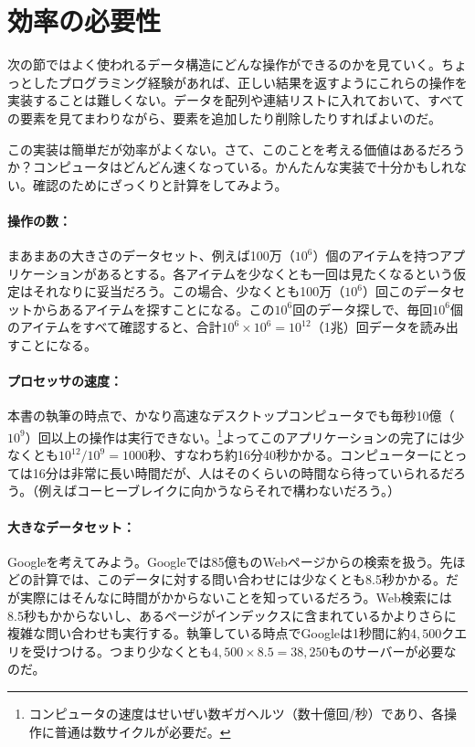 \section{効率の必要性}

次の節ではよく使われるデータ構造にどんな操作ができるのかを見ていく。ちょっとしたプログラミング経験があれば、正しい結果を返すようにこれらの操作を実装することは難しくない。データを配列や連結リストに入れておいて、すべての要素を見てまわりながら、要素を追加したり削除したりすればよいのだ。

この実装は簡単だが効率がよくない。さて、このことを考える価値はあるだろうか？コンピュータはどんどん速くなっている。かんたんな実装で十分かもしれない。確認のためにざっくりと計算をしてみよう。

\paragraph{操作の数：}
まあまあの大きさのデータセット、例えば100万（$10^6$）個のアイテムを持つアプリケーションがあるとする。各アイテムを少なくとも一回は見たくなるという仮定はそれなりに妥当だろう。この場合、少なくとも100万（$10^6$）回このデータセットからあるアイテムを探すことになる。この$10^6$回のデータ探しで、毎回$10^6$個のアイテムをすべて確認すると、合計$10^6\times 10^6=10^{12}$（1兆）回データを読み出すことになる。

\paragraph{プロセッサの速度：}
本書の執筆の時点で、かなり高速なデスクトップコンピュータでも毎秒10億（$10^9$）回以上の操作は実行できない。\footnote{コンピュータの速度はせいぜい数ギガヘルツ（数十億回/秒）であり、各操作に普通は数サイクルが必要だ。}よってこのアプリケーションの完了には少なくとも$10^{12}/10^9=1000$秒、すなわち約16分40秒かかる。コンピューターにとっては16分は非常に長い時間だが、人はそのくらいの時間なら待っていられるだろう。（例えばコーヒーブレイクに向かうならそれで構わないだろう。）

\paragraph{大きなデータセット：}
Googleを考えてみよう。Googleでは85億ものWebページからの検索を扱う。先ほどの計算では、このデータに対する問い合わせには少なくとも8.5秒かかる。だが実際にはそんなに時間がかからないことを知っているだろう。Web検索には8.5秒もかからないし、あるページがインデックスに含まれているかよりさらに複雑な問い合わせも実行する。執筆している時点でGoogleは1秒間に約$4,500$クエリを受けつける。つまり少なくとも$4,500 \times 8.5 = 38,250$ものサーバーが必要なのだ。

